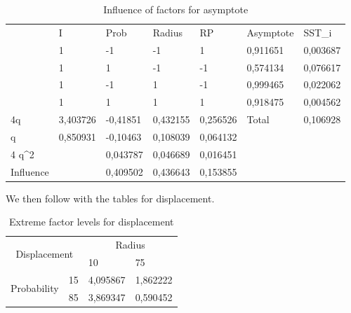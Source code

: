 \begin{table}[H]
\centering
\begin{tabular}{l|l|l|l|l|ll}
\cline{2-7}
 & I & Prob & Radius & RP & \multicolumn{1}{l|}{Asymptote} & \multicolumn{1}{l|}{SST\_i} \\ \cline{2-7} 
 & 1 & -1 & -1 & 1 & \multicolumn{1}{l|}{0,911651} & \multicolumn{1}{l|}{0,003687} \\ \cline{2-7} 
 & 1 & 1 & -1 & -1 & \multicolumn{1}{l|}{0,574134} & \multicolumn{1}{l|}{0,076617} \\ \cline{2-7} 
 & 1 & -1 & 1 & -1 & \multicolumn{1}{l|}{0,999465} & \multicolumn{1}{l|}{0,022062} \\ \cline{2-7} 
 & 1 & 1 & 1 & 1 & \multicolumn{1}{l|}{0,918475} & \multicolumn{1}{l|}{0,004562} \\ \hline
\multicolumn{1}{|l|}{4q} & 3,403726 & -0,41851 & 0,432155 & 0,256526 & \multicolumn{1}{l|}{Total} & \multicolumn{1}{l|}{0,106928} \\ \hline
\multicolumn{1}{|l|}{q} & 0,850931 & -0,10463 & 0,108039 & 0,064132 &  &  \\ \cline{1-5}
\multicolumn{1}{|l|}{4 q\textasciicircum{}2} &  & 0,043787 & 0,046689 & 0,016451 &  &  \\ \cline{1-5}
\multicolumn{1}{|l|}{Influence} &  & 0,409502 & 0,436643 & 0,153855 &  &  \\ \cline{1-5}
\end{tabular}
\caption{Influence of factors for asymptote}
\end{table}

We then follow with the tables for displacement.

\begin{table}[H]
\centering
\begin{tabular}{|cl|ll|}
\hline
\multicolumn{2}{|c|}{\multirow{2}{*}{Displacement}} & \multicolumn{2}{c|}{Radius} \\ \cline{3-4} 
\multicolumn{2}{|c|}{} & \multicolumn{1}{l|}{10} & 75 \\ \hline
\multicolumn{1}{|c|}{\multirow{2}{*}{Probability}} & 15 & \multicolumn{1}{l|}{4,095867} & 1,862222 \\ \cline{2-4} 
\multicolumn{1}{|c|}{} & 85 & \multicolumn{1}{l|}{3,869347} & 0,590452 \\ \hline
\end{tabular}
\caption{Extreme factor levels for displacement}
\end{table}


